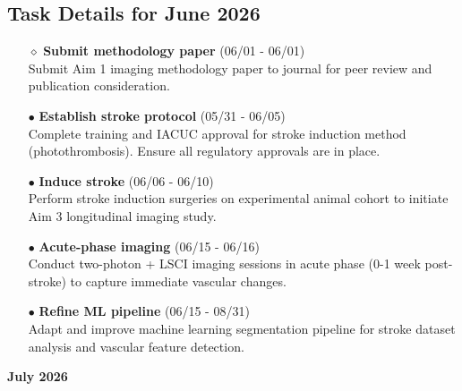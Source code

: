 \documentclass[landscape,a4paper]{article}
\begin{document}
\subsection{Task Details for June 2026}
\begin{itemize}[leftmargin=1cm]
    \item[\textcolor{researchout}{$\diamond$}] \textbf{Submit methodology paper} (06/01 - 06/01)\\ Submit Aim 1 imaging methodology paper to journal for peer review and publication consideration.
    \item[\textcolor{other}{$\bullet$}] \textbf{Establish stroke protocol} (05/31 - 06/05)\\ Complete training and IACUC approval for stroke induction method (photothrombosis). Ensure all regulatory approvals are in place.
    \item[\textcolor{other}{$\bullet$}] \textbf{Induce stroke} (06/06 - 06/10)\\ Perform stroke induction surgeries on experimental animal cohort to initiate Aim 3 longitudinal imaging study.
    \item[\textcolor{other}{$\bullet$}] \textbf{Acute-phase imaging} (06/15 - 06/16)\\ Conduct two-photon + LSCI imaging sessions in acute phase (0-1 week post-stroke) to capture immediate vascular changes.
    \item[\textcolor{other}{$\bullet$}] \textbf{Refine ML pipeline} (06/15 - 08/31)\\ Adapt and improve machine learning segmentation pipeline for stroke dataset analysis and vascular feature detection.
\end{itemize}

\newpage
\pagestyle{empty}

\begin{center}
{\large\textbf{July 2026}}
\end{center}

\vspace{0.5cm}
\end{document}
